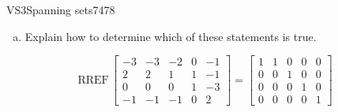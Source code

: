 \begin{exercise}{VS3}{Spanning sets}{7478}
\begin{exerciseStatement}
\begin{enumerate}[(a)]
\begin{itemize}
 The set of vectors \(\left\{ \left[\begin{array}{c}
-3 \\
2 \\
0 \\
-1
\end{array}\right] , \left[\begin{array}{c}
-3 \\
2 \\
0 \\
-1
\end{array}\right] , \left[\begin{array}{c}
-2 \\
1 \\
0 \\
-1
\end{array}\right] , \left[\begin{array}{c}
0 \\
1 \\
1 \\
0
\end{array}\right] , \left[\begin{array}{c}
-1 \\
-1 \\
-3 \\
2
\end{array}\right] \right\}\) does \textbf{not} span \(\mathbb R^4\). 

 
\end{itemize}

     
\item  

 Explain how to determine which of these statements is true. 

 
\end{enumerate}

     \end{exerciseStatement}
 \begin{exerciseAnswer} 

 \[
\mathrm{RREF}\, \left[\begin{array}{ccccc}
-3 & -3 & -2 & 0 & -1 \\
2 & 2 & 1 & 1 & -1 \\
0 & 0 & 0 & 1 & -3 \\
-1 & -1 & -1 & 0 & 2
\end{array}\right] = \left[\begin{array}{ccccc}
1 & 1 & 0 & 0 & 0 \\
0 & 0 & 1 & 0 & 0 \\
0 & 0 & 0 & 1 & 0 \\
0 & 0 & 0 & 0 & 1
\end{array}\right]
            \] 


\end{exerciseAnswer}
\end{exercise}
